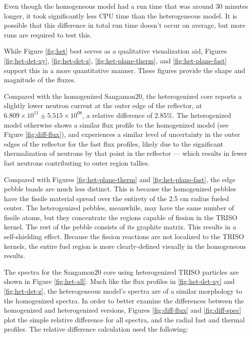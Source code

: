 

Even though the homogeneous model had a run time that was around 30 minutes longer, it took significantly less CPU time than the heterogeneous model.  It is possible that this difference in total run time doesn't occur on average, but more runs are required to test this.

While Figure \ref{fig:het} best serves as a qualitative visualization aid, Figures \ref{fig:het-det-xy}, \ref{fig:het-det-z}, \ref{fig:het-plane-therm}, and \ref{fig:het-plane-fast} support this in a more quantitative manner.  These figures provide the shape and magnitude of the fluxes.




Compared with the homogenized Sangamon20, the heterogenized core reports a slightly lower neutron current at the outer edge of the reflector, at $6.809\times10^{11} \pm 5.515\times10^{08}$, a relative difference of 2.85\%.  The heterogenized model otherwise shows a similar flux profile to the homogenized model (see Figure \ref{fig:diff-flux}), and experiences a similar level of uncertainty in the outer edges of the reflector for the fast flux profiles, likely due to the significant thermalization of neutrons by that point in the reflector --- which results in fewer fast neutrons contributing to outer region tallies.







Compared with Figures  \ref{fig:het-plane-therm} and \ref{fig:het-plane-fast}, the edge pebble bands are much less distinct.  This is because the homogenized pebbles have the fissile material spread over the entirety of the 2.5 cm radius fueled center.  The heterogenized pebbles, meanwhile, may have the same number of fissile atoms, but they concentrate the regions capable of fission in the TRISO kernel.  The rest of the pebble consists of its graphite matrix.  This results in a self-shielding effect.  Because the fission reactions are not localized to the TRISO kernels, the entire fuel region is more clearly-defined visually in the homogeneous results.




The spectra for the Sangamon20 core using heterogenized TRISO particles are shown in Figure \ref{fig:het-all}.  Much like the flux profiles in \ref{fig:het-det-xy} and \ref{fig:het-det-z}, the heterogeneous model's spectra are of a similar morphology to the homogenized spectra.  In order to better examine the differences between the homogenized and heterogenized versions, Figures \ref{fig:diff-flux} and \ref{fig:diff-spec} plot the simple relative difference for all spectra, and the radial fast and thermal profiles.  The relative difference calculation used the following:

